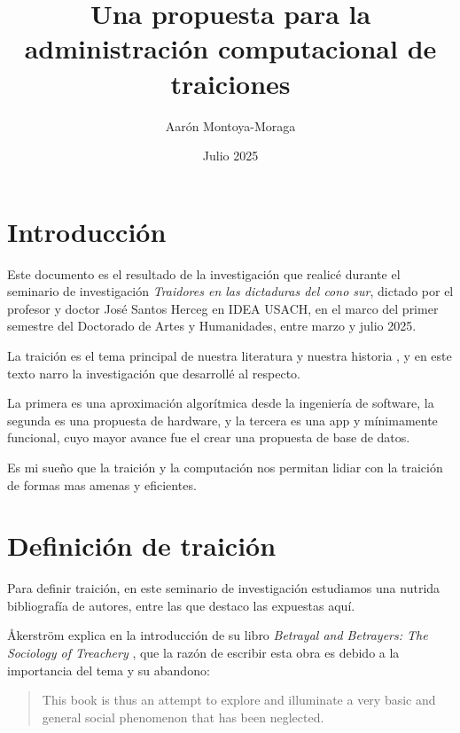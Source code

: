 \documentclass{article}
\title{Una propuesta para la administración computacional de traiciones}
\author{Aarón Montoya-Moraga}
\date{Julio 2025}
\begin{document}
\maketitle

\renewcommand*\contentsname{Tabla de contenidos}

\tableofcontents

\clearpage

\section{Introducción}

Este documento es el resultado de la investigación que realicé durante el seminario de investigación \textit{Traidores en las dictaduras del cono sur}, dictado por el profesor y doctor José Santos Herceg en IDEA USACH, en el marco del primer semestre del Doctorado de Artes y Humanidades, entre marzo y julio 2025.

La traición es el tema principal de nuestra literatura y nuestra historia \cite[p. 138]{ordinaryVicesShklar}, y en este texto narro la investigación que desarrollé al respecto.

La primera es una aproximación algorítmica desde la ingeniería de software, la segunda es una propuesta de hardware, y la tercera es una app y mínimamente funcional, cuyo mayor avance fue el crear una propuesta de base de datos.

Es mi sueño que la traición y la computación nos permitan lidiar con la traición de formas mas amenas y eficientes.

\clearpage

\section{Definición de traición}

Para definir traición, en este seminario de investigación estudiamos una nutrida bibliografía de autores, entre las que destaco las expuestas aquí.

Åkerström explica en la introducción de su libro \textit{Betrayal and Betrayers: The Sociology of Treachery} , que la razón de escribir esta obra es debido a la importancia del tema y su abandono:

\begin{quote}
This book is thus an attempt to explore and illuminate a very basic and general social phenomenon that has been neglected.\cite[p. x]{betrayalBetrayersAkerstrom}

\end{quote}
\end{document}
